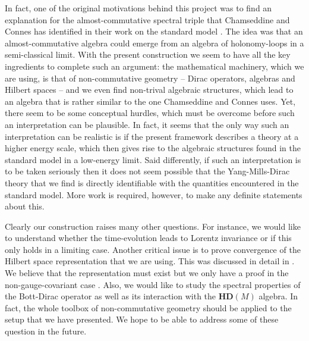 \documentclass[12pt]{article}
\begin{document}
In fact, one of the original motivations behind this project \cite{Aastrup:2005yk} was to find an explanation for the almost-commutative spectral triple that Chamseddine and Connes has identified in their work on the standard model \cite{Connes:1996gi,Chamseddine:1991qh}. The idea was that an almost-commutative algebra could emerge from an algebra of holonomy-loops in a semi-classical limit. With the present construction we seem to have all the key ingredients to complete such an argument: the mathematical machinery, which we are using, is that of non-commutative geometry -- Dirac operators, algebras and Hilbert spaces -- and we even find non-trival algebraic structures, which lead to an algebra that is rather similar to the one Chamseddine and Connes uses. Yet, there seem to be some conceptual hurdles, which must be overcome before such an interpretation can be plausible. In fact, it seems that the only way such an interpretation can be realistic is if the present framework describes a theory at a higher energy scale, which then gives rise to the algebraic structures found in the standard model in a low-energy limit. Said differently, if such an interpretation is to be taken seriously then it does not seem possible that the Yang-Mills-Dirac theory that we find is directly identifiable with the quantities encountered in the standard model. More work is required, however, to make any definite statements about this.



Clearly our construction raises many other questions. For instance, we would like to understand whether the time-evolution leads to Lorentz invariance or if this only holds in a limiting case. Another critical issue is to prove convergence of the Hilbert space representation that we are using. This was discussed in detail in \cite{Aastrup:2019yui}. We believe that the representation must exist but we only have a proof in the non-gauge-covariant case \cite{Aastrup:2017vrm}. Also, we would like to study the spectral properties of the Bott-Dirac operator as well as its interaction with the $\mathbf{HD}(M)$ algebra. In fact, the whole toolbox of non-commutative geometry should be applied to the setup that we have presented. We hope to be able to address some of these question in the future.












\vspace{1cm}
\\
\end{document}
